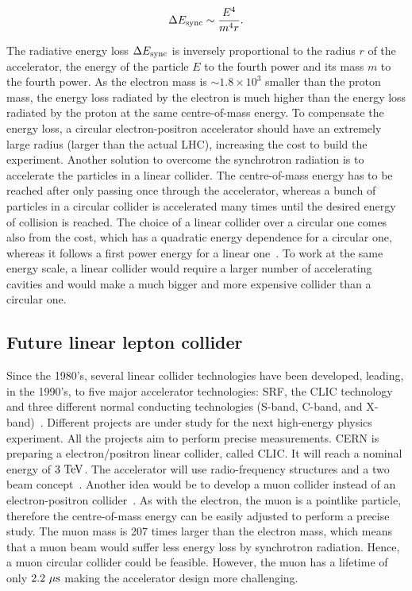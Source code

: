     \begin{equation}
     \Delta E_{\rm{sync}} \sim \frac{E^4}{m^4r}.
       \label{eq:Esynchrotron}
    \end{equation} 

    The radiative energy loss $\Delta E_{\rm{sync}}$ is inversely proportional to the radius $r$ of the accelerator, the energy of the particle $E$ to the fourth power and its mass $m$ to the fourth power.
    As the electron mass is $\sim 1.8 \times 10^3$ smaller than the proton mass, the energy loss radiated by the electron is much higher than the energy loss radiated by the proton at the same centre-of-mass energy.
    To compensate the energy loss, a circular electron-positron accelerator should have an extremely large radius (larger than the actual \gls{LHC}), increasing the cost to build the experiment.
    Another solution to overcome the synchrotron radiation is to accelerate the particles in a linear collider.
    The centre-of-mass energy has to be reached after only passing once through the accelerator, whereas a bunch of particles in a circular collider is accelerated many times until the desired energy of collision is reached.
    The choice of a linear collider over a circular one comes also from the cost, which has a quadratic energy dependence for a circular one, whereas it follows a first power energy for a linear one~\cite{Richter:1976ug}. 
    To work at the same energy scale, a linear collider would require a larger number of accelerating cavities and would make a much bigger and more expensive collider than a circular one.

    \subsection{Future linear lepton collider}
    
    Since the 1980's, several linear collider technologies have been developed, leading, in the 1990's, to five major accelerator technologies: \gls{SRF}, the \gls{CLIC} technology and three different normal conducting technologies (S-band, C-band, and X-band)~\cite{Desy1988}.
    Different projects are under study for the next high-energy physics experiment. 
    All the projects aim to perform precise measurements.
    CERN is preparing a electron/positron linear collider, called \gls{CLIC}.
    It will reach a nominal energy of $3~\rm{TeV}$.
    The accelerator will use radio-frequency structures and a two beam concept~\cite{CLIC}.
    Another idea would be to develop a muon collider instead of an electron-positron collider~\cite{Lipton2012}.
    As with the electron, the muon is a pointlike particle, therefore the centre-of-mass energy can be easily adjusted to perform a precise study.
    The muon mass is 207 times larger than the electron mass, which means that a muon beam would suffer less energy loss by synchrotron radiation.
    Hence, a muon circular collider could be feasible.
    However, the muon has a lifetime of only $2.2~\rm{\mu s}$ making the accelerator design more challenging.
 
